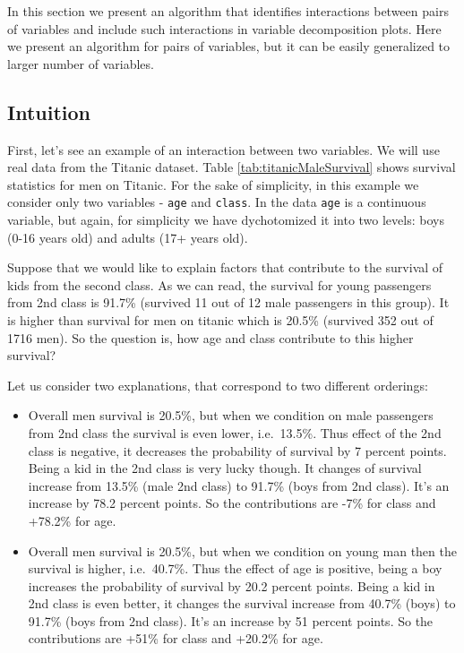 \documentclass[12pt,]{krantz}
\providecommand{\tightlist}{%
  \setlength{\itemsep}{0pt}\setlength{\parskip}{0pt}}
\theoremstyle{definition}
\theoremstyle{definition}
\theoremstyle{definition}
\theoremstyle{remark}
\begin{document}
In this section we present an algorithm that identifies interactions
between pairs of variables and include such interactions in variable
decomposition plots. Here we present an algorithm for pairs of
variables, but it can be easily generalized to larger number of
variables.

\hypertarget{intuition-1}{%
\subsection{Intuition}\label{intuition-1}}

First, let's see an example of an interaction between two variables. We
will use real data from the Titanic dataset. Table
\ref{tab:titanicMaleSurvival} shows survival statistics for men on
Titanic. For the sake of simplicity, in this example we consider only
two variables - \texttt{age} and \texttt{class}. In the data
\texttt{age} is a continuous variable, but again, for simplicity we have
dychotomized it into two levels: boys (0-16 years old) and adults (17+
years old).

Suppose that we would like to explain factors that contribute to the
survival of kids from the second class. As we can read, the survival for
young passengers from 2nd class is 91.7\% (survived 11 out of 12 male
passengers in this group). It is higher than survival for men on titanic
which is 20.5\% (survived 352 out of 1716 men). So the question is, how
age and class contribute to this higher survival?

Let us consider two explanations, that correspond to two different
orderings:

\begin{itemize}
\tightlist
\item
  Overall men survival is 20.5\%, but when we condition on male
  passengers from 2nd class the survival is even lower, i.e.~13.5\%.
  Thus effect of the 2nd class is negative, it decreases the probability
  of survival by 7 percent points. Being a kid in the 2nd class is very
  lucky though. It changes of survival increase from 13.5\% (male 2nd
  class) to 91.7\% (boys from 2nd class). It's an increase by 78.2
  percent points. So the contributions are -7\% for class and +78.2\%
  for age.
\item
  Overall men survival is 20.5\%, but when we condition on young man
  then the survival is higher, i.e.~40.7\%. Thus the effect of age is
  positive, being a boy increases the probability of survival by 20.2
  percent points. Being a kid in 2nd class is even better, it changes
  the survival increase from 40.7\% (boys) to 91.7\% (boys from 2nd
  class). It's an increase by 51 percent points. So the contributions
  are +51\% for class and +20.2\% for age.
\end{itemize}
\end{document}
